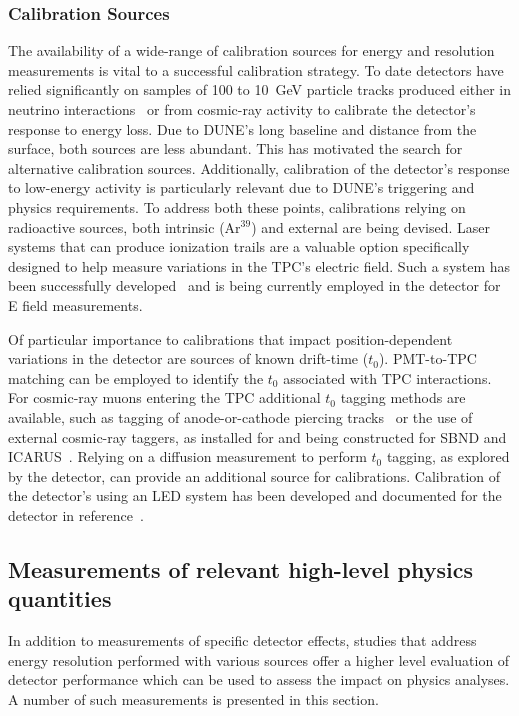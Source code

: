 \subsubsection{Calibration Sources}
The availability of a wide-range of calibration sources for energy and resolution measurements is vital to a successful calibration strategy. To date  detectors have relied significantly on samples of \num{100} to \SI{10}{\GeV} particle tracks produced either in neutrino interactions~\cite{bib:ArgoNeuTmuons} or from cosmic-ray activity to calibrate the detector's response to energy loss. Due to DUNE's long baseline and distance from the surface, both sources are less abundant. This has motivated the search for alternative calibration sources. Additionally, calibration of the detector's response to low-energy activity is particularly relevant due to DUNE's triggering and  physics requirements. To address both these points, calibrations relying on radioactive sources, both intrinsic (Ar${}^{39}$) and external are being devised. Laser systems that can produce ionization trails are a valuable option specifically designed to help measure variations in the TPC's electric field. Such a system has been successfully developed~\cite{bib:LASER} and is being currently employed in the  detector for E field measurements.

Of particular importance to calibrations that impact position-dependent variations in the detector are sources of known drift-time ($t_0$). PMT-to-TPC matching can be employed to identify the $t_0$ associated with TPC interactions. For cosmic-ray muons entering the TPC additional $t_0$ tagging methods are available, such as tagging of anode-or-cathode piercing tracks~\cite{bib:uB_ACPT} or the use of external cosmic-ray taggers, as installed for  and being constructed for SBND and ICARUS~\cite{bib:CRT}. Relying on a diffusion measurement to perform $t_0$ tagging, as explored by the  detector, can provide an additional source for calibrations.
Calibration of the detector's  using an LED system has been developed and documented for the  detector in reference~\cite{bib:uBPMTcalibration}.

\subsection{Measurements of relevant high-level physics quantities}
In addition to measurements of specific detector effects, studies that address energy resolution performed with various sources offer a higher level evaluation of detector performance which can be used to assess the impact on physics analyses. A number of such measurements is presented in this section.

